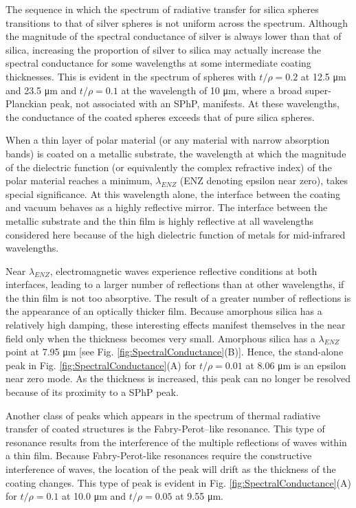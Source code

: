 The sequence in which the spectrum of radiative transfer for silica spheres transitions to that of silver spheres is not uniform across the spectrum. Although the magnitude of the spectral conductance of silver is always lower than that of silica, increasing the proportion of silver to silica may actually increase the spectral conductance for some wavelengths at some intermediate coating thicknesses. This is evident in the spectrum of spheres with $t/\rho=0.2$ at 12.5 \si{\micro\meter} and 23.5 \si{\micro\meter} and $t/\rho=0.1$ at the wavelength of 10 \si{\micro\meter}, where a broad super-Planckian peak, not associated with an SPhP, manifests. At these wavelengths, the conductance of the coated spheres exceeds that of pure silica spheres. 

When a thin layer of polar material (or any material with narrow absorption bands) is coated on a metallic substrate, the wavelength at which the magnitude of the dielectric function (or equivalently the complex refractive index) of the polar material reaches a minimum, $\lambda_{ENZ}$ (ENZ denoting epsilon near zero), takes special significance.\cite{Narayanaswamy2014} At this wavelength alone, the interface between the coating and vacuum behaves as a highly reflective mirror. The interface between the metallic substrate and the thin film is highly reflective at all wavelengths considered here because of the high dielectric function of metals for mid-infrared wavelengths.

Near $\lambda_{ENZ}$, electromagnetic waves experience reflective conditions at both interfaces, leading to a larger number of reflections than at other wavelengths, if the thin film is not too absorptive. The result of a greater number of reflections is the appearance of an optically thicker film. Because amorphous silica has a relatively high damping, these interesting effects manifest themselves in the near field only when the thickness becomes very small. Amorphous silica has a $\lambda_{ENZ}$ point at 7.95 \si{\micro\meter} [see Fig. \ref{fig:SpectralConductance}(B)]. Hence, the stand-alone peak in Fig. \ref{fig:SpectralConductance}(A) for $t/\rho = 0.01$ at 8.06 \si{\micro\meter} is an epsilon near zero mode. As the thickness is increased, this peak can no longer be resolved because of its proximity to a SPhP peak.

Another class of peaks which appears in the spectrum of thermal radiative transfer of coated structures is the Fabry-Perot--like resonance. This type of resonance results from the interference of the multiple reflections of waves within a thin film. Because Fabry-Perot-like resonances require the constructive interference of waves, the location of the peak will drift as the thickness of the coating changes. This type of peak is evident in Fig. \ref{fig:SpectralConductance}(A) for $t/\rho = 0.1$ at 10.0 \si{\micro\meter} and $t/\rho = 0.05$ at 9.55 \si{\micro\meter}.

